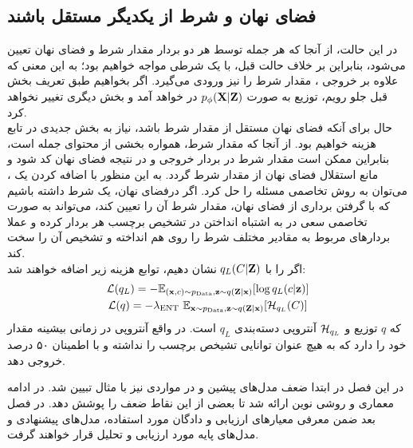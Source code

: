 \subsection{فضای نهان و شرط از یکدیگر مستقل باشند}
در این حالت، از آنجا که هر جمله توسط هر دو بردار مقدار شرط و فضای نهان تعیین می‌شود، بنابراین بر خلاف حالت قبل، با یک \decoder{} شرطی مواجه خواهیم بود؛ به این معنی که علاوه بر خروجی \encoder{}، مقدار شرط را نیز ورودی می‌گیرد. اگر بخواهیم طبق تعریف بخش قبل جلو رویم، توزیع \decoder{} به صورت  $p_\phi({\bf X}|{\bf Z})$ در خواهد آمد و بخش دیگری تغییر نخواهد کرد.
\\
حال برای آنکه فضای نهان مستقل از مقدار شرط باشد، نیاز به بخش جدیدی در تابع هزینه خواهیم بود. از آنجا که مقدار شرط، همواره بخشی از محتوای جمله است، بنابراین ممکن است مقدار شرط در بردار خروجی \encoder{} و در نتیجه فضای نهان کد شود و مانع استقلال فضای نهان از مقدار شرط گردد. به این منظور با اضافه کردن یک \classifier{}، می‌توان به روش تخاصمی مسئله را حل کرد. اگر درفضای نهان، یک \classifier{} شرط داشته باشیم که با گرفتن برداری از فضای نهان، مقدار شرط آن را تعیین کند، \encoder{} می‌تواند به صورت تخاصمی سعی در به اشتباه انداختن \classifier{} در تشخیص برچسب هر بردار کرده و عملا بردار‌های مربوط به مقادیر مختلف شرط را روی هم انداخته و تشخیص آن را سخت کند.
\\
اگر \classifier{} را با $q_L(C|{\bf Z})$ نشان دهیم، توابع هزینه زیر اضافه خواهند شد:
\begin{gather}
    {\mathcal{L}}(q_L) = -\mathbb E_{({\bf x},c) \sim p_\text{Data}, {\bf z} \sim q({\bf Z}|{\bf x})} [\log q_L(c|{\bf z})]
    \\
    {\mathcal{L}}(q) = -\lambda_\text{ENT} ~\mathbb E_{{\bf x} \sim p_\text{Data}, {\bf z} \sim q({\bf Z}|{\bf x})} [{\mathcal{H}}_{q_L}(C)]
\end{gather}
که $q$ توزیع \encoder{} و  ${\mathcal{H}}_{q_L}$ آنتروپی دسته‌بندی \classifier{} 
$q_L$ 
است. در واقع آنتروپی در زمانی بیشینه مقدار خود را دارد که \classifier{} به هیچ عنوان توانایی تشیخص برچسب را نداشته و با اطمینان ۵۰ درصد خروجی دهد.

در این فصل در ابتدا ضعف مدل‌های پیشین و در مواردی نیز با مثال تبیین شد. در ادامه معماری و روشی نوین ارائه شد تا بعضی از این نقاط ضعف را پوشش دهد. در فصل بعد ضمن معرفی معیارهای ارزیابی و دادگان مورد استفاده، مدل‌های پیشنهادی و مدل‌های پایه مورد ارزیابی و تحلیل قرار خواهند گرفت.

